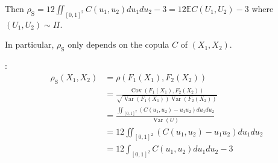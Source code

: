 Then
$ \rho_{\mathrm{S}}=12 \iint_{[0,1]^{2}} C\left(u_{1}, u_{2}\right) d u_{1} d u_{2}-3=12 \mathbb{E} C\left(U_{1}, U_{2}\right)-3$ where $\left(U_{1}, U_{2}\right) \sim \Pi$. 

In particular, $\rho_{\mathrm{S}}$ only depends on the copula $C$ of $\left(X_{1}, X_{2}\right)$.

:
$$
\begin{aligned}
\rho_{\mathrm{S}}\left(X_{1}, X_{2}\right)&=\rho\left(F_{1}\left(X_{1}\right), F_{2}\left(X_{2}\right)\right) \\
&=\frac{\operatorname{Cov}\left(F_{1}\left(X_{1}\right), F_{2}\left(X_{2}\right)\right)}{\sqrt{\operatorname{Var}\left(F_{1}\left(X_{1}\right)\right) \operatorname{Var}\left(F_{2}\left(X_{2}\right)\right)}}\\
&= \frac{\iint_{[0,1]^{2}}\left(C\left(u_{1}, u_{2}\right)-u_{1} u_{2}\right) d u_{1} d u_{2}}{\operatorname{Var}(U)} \\
&=12 \iint_{[0,1]^{2}}\left(C\left(u_{1}, u_{2}\right)-u_{1} u_{2}\right) d u_{1} d u_{2}\\
&=12 \int_{[0,1]^{2}} C\left(u_{1}, u_{2}\right) d u_{1} d u_{2}-3
\end{aligned}
$$

